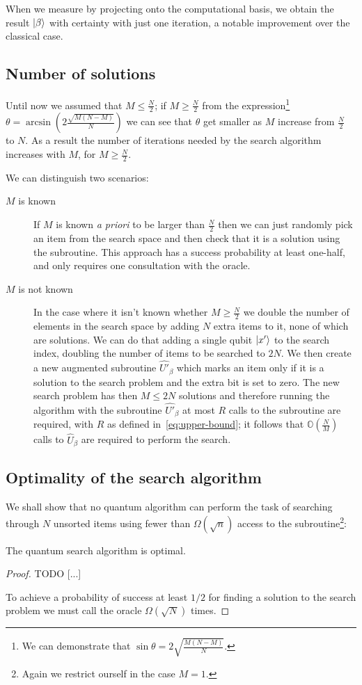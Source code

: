 When we measure by projecting onto the computational basis, we obtain the result $\ket{\beta}$ with certainty with just one iteration, a notable improvement over the classical case.

\subsection{Number of solutions}\label{sec:M}
Until now we assumed that $M\leq \frac{N}{2}$; if $M \geq \frac{N}{2}$ from the expression\footnote{We can demonstrate that $\sin\theta = 2\sqrt{\frac{M(N-M)}{N}}$.} $\theta=\arcsin(2\frac{\sqrt{M(N-M)}}{N})$ we can see that $\theta$ get smaller as $M$ increase from $\frac{N}{2}$ to $N$. As a result the number of iterations needed by the search algorithm increases with $M$, for $M\geq \frac{N}{2}$.

We can distinguish two scenarios:
\begin{description}
   \item[$M$ is known] If $M$ is known \emph{a priori} to be larger than $\frac{N}{2}$ then we can just randomly pick an item from the search space and then check that it is a solution using the subroutine. This approach has a success probability at least one-half, and only requires one consultation with the oracle.
   \item[$M$ is not known] In the case where it isn't known whether $M\geq \frac{N}{2}$ we double the number of elements in the search space by adding $N$ extra items to it, none of which are solutions. We can do that adding a single qubit $\ket{x'}$ to the search index, doubling the number of items to be searched to $2N$. We then create a new augmented subroutine $\hat{U'}_\beta$ which marks an item only if it is a solution to the search problem and the extra bit is set to zero. The new search problem has then $M \leq 2N$ solutions and therefore running the algorithm with the subroutine $\hat{U'}_\beta$ at most $R$ calls to the subroutine are required, with $R$ as defined in~\ref{eq:upper-bound}; it follows that $\mathbb{O}(\frac{N}{M})$ calls to $\hat{U}_\beta$ are required to perform the search.
   
\end{description}
\subsection{Optimality of the search algorithm}
We shall show that no quantum algorithm can perform the task of searching through $N$ unsorted items using fewer than $\Omega(\sqrt{n})$ access to the subroutine\footnote{Again we restrict ourself in the case $M=1$.}:
\begin{theorem}
The quantum search algorithm is optimal. 
\end{theorem}
\begin{proof}
TODO [...]

To achieve a probability of success at least $1/2$ for finding a solution to the search problem we must call the oracle $\Omega(\sqrt{N})$ times.
\end{proof}

